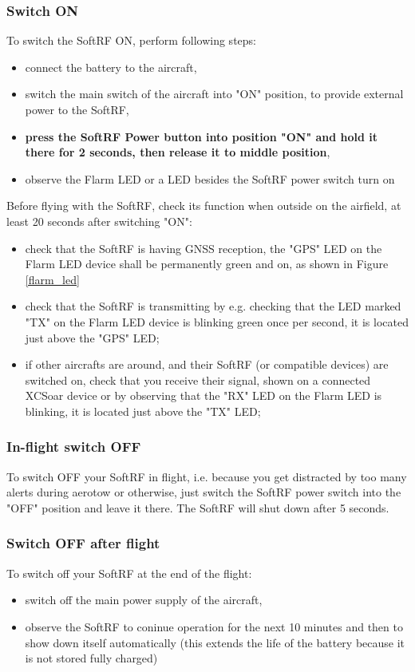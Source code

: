 \documentclass[10pt,a4paper]{article}
\begin{document}
\subsubsection{Switch ON}\label{power_on}
To switch the SoftRF ON, perform following steps:

\begin{itemize}
\item connect the battery to the aircraft, 
\item switch the main switch of the aircraft into "ON" position, to provide external power to the SoftRF,
\item {\bf press the SoftRF Power button into position "ON" and hold it there for 2 seconds, then release it to middle position},
\item observe the Flarm LED or a LED besides the SoftRF power switch turn on
\end{itemize}

Before flying with the SoftRF, check its function when outside on the airfield, at least 20 seconds after switching "ON":
\begin{itemize}
\item check that the SoftRF is having GNSS reception, the "GPS" LED on the Flarm LED device shall be permanently green and on, as shown in Figure \ref{flarm_led}
\item check that the SoftRF is transmitting by e.g. checking that the LED marked "TX" on the Flarm LED device is blinking green once per second, it is located just above the "GPS" LED;
\item if other aircrafts are around, and their SoftRF (or compatible devices) are switched on, check that you receive their signal, shown on a connected XCSoar device or by observing that the "RX" LED on the Flarm LED is blinking, it is located just above the "TX" LED;
\end{itemize}

\subsubsection{In-flight switch OFF}
To switch OFF your SoftRF in flight, i.e. because you get distracted by too many alerts during aerotow or otherwise, just switch the SoftRF power switch into the "OFF" position and leave it there. The SoftRF will shut down after 5 seconds.

\subsubsection{Switch OFF after flight}
To switch off your SoftRF at the end of the flight:
\begin{itemize}
\item switch off the main power supply of the aircraft,
\item observe the SoftRF to coninue operation for the next 10 minutes and then to show down itself automatically (this extends the life of the battery because it is not stored fully charged)
\end{itemize} 
\end{document}
